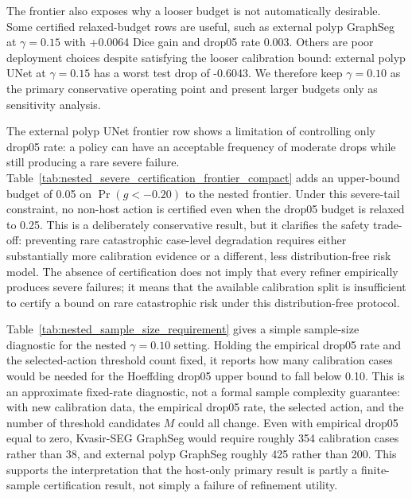 \documentclass[preprint,12pt]{elsarticle}
\begin{document}
The frontier also exposes why a looser budget is not automatically desirable.
Some certified relaxed-budget rows are useful, such as external polyp GraphSeg
at $\gamma=0.15$ with +0.0064 Dice gain and drop05 rate 0.003. Others are poor
deployment choices despite satisfying the looser calibration bound: external
polyp UNet at $\gamma=0.15$ has a worst test drop of -0.6043. We therefore keep
$\gamma=0.10$ as the primary conservative operating point and present larger
budgets only as sensitivity analysis.



The external polyp UNet frontier row shows a limitation of controlling only
drop05 rate: a policy can have an acceptable frequency of moderate drops while
still producing a rare severe failure. Table~\ref{tab:nested_severe_certification_frontier_compact}
adds an upper-bound budget of 0.05 on $\Pr(g<-0.20)$ to the nested frontier.
Under this severe-tail constraint, no non-host action is certified even when
the drop05 budget is relaxed to 0.25. This is a deliberately conservative
result, but it clarifies the safety trade-off: preventing rare catastrophic
case-level degradation requires either substantially more calibration evidence
or a different, less distribution-free risk model. The absence of certification
does not imply that every refiner empirically produces severe failures; it means
that the available calibration split is insufficient to certify a bound on rare
catastrophic risk under this distribution-free protocol.



Table~\ref{tab:nested_sample_size_requirement} gives a simple sample-size
diagnostic for the nested $\gamma=0.10$ setting. Holding the empirical drop05
rate and the selected-action threshold count fixed, it reports how many
calibration cases would be needed for the Hoeffding drop05 upper bound to fall
below 0.10. This is an approximate fixed-rate diagnostic, not a formal sample
complexity guarantee: with new calibration data, the empirical drop05 rate, the
selected action, and the number of threshold candidates $M$ could all change.
Even with empirical drop05 equal to zero, Kvasir-SEG GraphSeg would
require roughly 354 calibration cases rather than 38, and external polyp
GraphSeg roughly 425 rather than 200. This supports the interpretation that
the host-only primary result is partly a finite-sample certification result,
not simply a failure of refinement utility.
\end{document}

